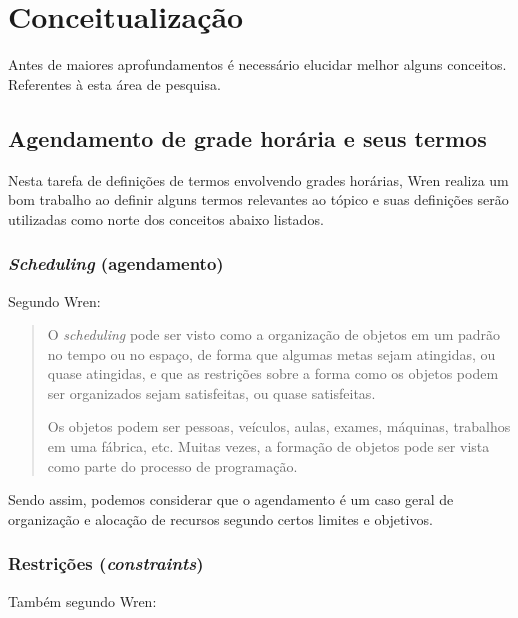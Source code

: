 \chapter{Conceitualização}

Antes de maiores aprofundamentos é necessário elucidar melhor alguns conceitos. Referentes à esta área de pesquisa.

\section{Agendamento de grade horária e seus termos}

    Nesta tarefa de definições de termos envolvendo grades horárias, Wren \cite{WREN1996} realiza um bom trabalho ao definir alguns termos relevantes ao tópico e suas definições serão utilizadas como norte dos conceitos abaixo listados.
    
    \subsection{\textit{Scheduling} (agendamento)}
    
        Segundo Wren: \cite{WREN1996}
        
        \begin{quote}\footnotesize
            O \textit{scheduling} pode ser visto como a organização de objetos em um padrão no tempo ou no espaço, de forma que algumas metas sejam atingidas, ou quase atingidas, e que as restrições sobre a forma como os objetos podem ser organizados sejam satisfeitas, ou quase satisfeitas.
            
            Os objetos podem ser pessoas, veículos, aulas, exames, máquinas, trabalhos em uma fábrica, etc. Muitas vezes, a formação de objetos pode ser vista como parte do processo de programação.
        \end{quote}
        
        Sendo assim, podemos considerar que o agendamento é um caso geral de organização e alocação de recursos segundo certos limites e objetivos.
    
    \subsection{Restrições (\textit{constraints})}
    
        Também segundo Wren: \cite{WREN1996}
        
